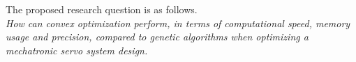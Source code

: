 The proposed research question is as follows.
\\

\textit{How can convex optimization perform, in terms of computational speed, memory usage and precision, compared to genetic algorithms when optimizing a mechatronic servo system design.}


